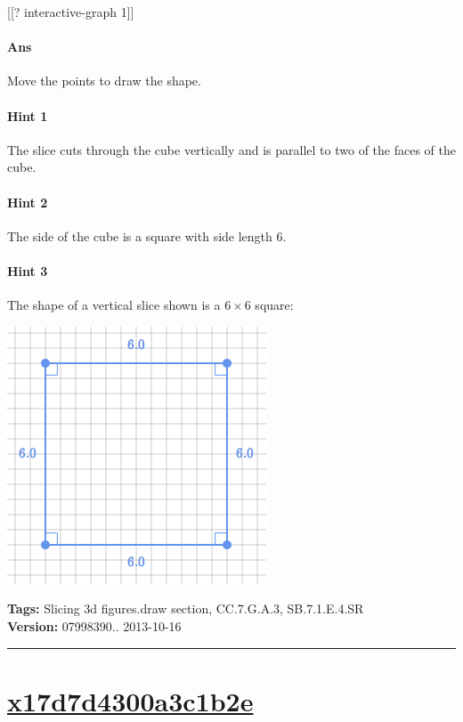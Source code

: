 \documentclass[twocolumn,10pt]{article}
\def\shrinkfactor{0.4}
\begin{document}
[[? interactive-graph 1]] 


\paragraph{Ans} Move the points to draw the shape. 

\paragraph{Hint 1}The slice cuts through the cube vertically and is parallel to two of the faces of the cube.

\paragraph{Hint 2}The side of the cube is a square with side length $6$.

\paragraph{Hint 3}The shape of a vertical slice shown is a $6 \times 6$ square:   

\includegraphics[scale=\shrinkfactor]{figures/17941d59a646cbfd163d76d74fb932b7b62b27c8.png}



\medskip
\noindent
\textbf{Tags:} {\footnotesize Slicing 3d figures.draw section, CC.7.G.A.3, SB.7.1.E.4.SR}\\
\textbf{Version:} 07998390.. 2013-10-16
\smallskip\hrule





\section{\href{https://www.khanacademy.org/devadmin/content/items/x17d7d4300a3c1b2e}{x17d7d4300a3c1b2e}}
\end{document}
